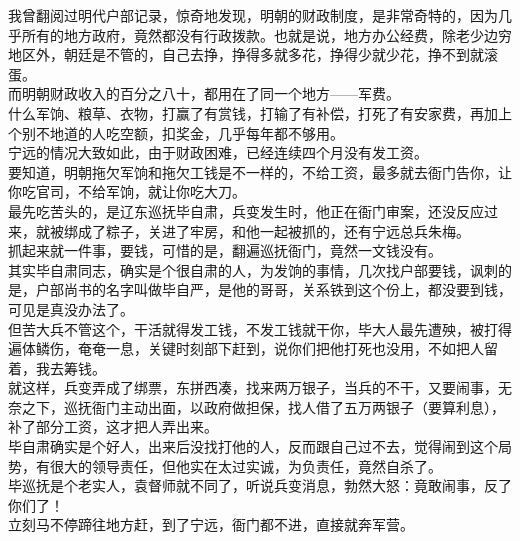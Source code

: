 \begin{multicols}{\theparacolNo}
我曾翻阅过明代户部记录，惊奇地发现，明朝的财政制度，是非常奇特的，因为几乎所有的地方政府，竟然都没有行政拨款。也就是说，地方办公经费，除老少边穷地区外，朝廷是不管的，自己去挣，挣得多就多花，挣得少就少花，挣不到就滚蛋。\\

而明朝财政收入的百分之八十，都用在了同一个地方——军费。\\

什么军饷、粮草、衣物，打赢了有赏钱，打输了有补偿，打死了有安家费，再加上个别不地道的人吃空额，扣奖金，几乎每年都不够用。\\

宁远的情况大致如此，由于财政困难，已经连续四个月没有发工资。\\

要知道，明朝拖欠军饷和拖欠工钱是不一样的，不给工资，最多就去衙门告你，让你吃官司，不给军饷，就让你吃大刀。\\

最先吃苦头的，是辽东巡抚毕自肃，兵变发生时，他正在衙门审案，还没反应过来，就被绑成了粽子，关进了牢房，和他一起被抓的，还有宁远总兵朱梅。\\

抓起来就一件事，要钱，可惜的是，翻遍巡抚衙门，竟然一文钱没有。\\

其实毕自肃同志，确实是个很自肃的人，为发饷的事情，几次找户部要钱，讽刺的是，户部尚书的名字叫做毕自严，是他的哥哥，关系铁到这个份上，都没要到钱，可见是真没办法了。\\

但苦大兵不管这个，干活就得发工钱，不发工钱就干你，毕大人最先遭殃，被打得遍体鳞伤，奄奄一息，关键时刻部下赶到，说你们把他打死也没用，不如把人留着，我去筹钱。\\

就这样，兵变弄成了绑票，东拼西凑，找来两万银子，当兵的不干，又要闹事，无奈之下，巡抚衙门主动出面，以政府做担保，找人借了五万两银子（要算利息），补了部分工资，这才把人弄出来。\\

毕自肃确实是个好人，出来后没找打他的人，反而跟自己过不去，觉得闹到这个局势，有很大的领导责任，但他实在太过实诚，为负责任，竟然自杀了。\\

毕巡抚是个老实人，袁督师就不同了，听说兵变消息，勃然大怒：竟敢闹事，反了你们了！\\

立刻马不停蹄往地方赶，到了宁远，衙门都不进，直接就奔军营。\\


\end{multicols}
